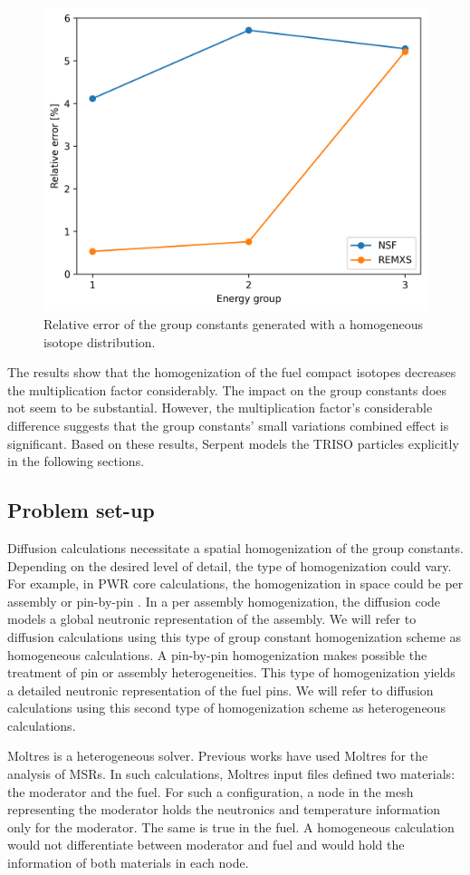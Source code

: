 \documentclass[11pt,letterpaper]{article}
\begin{document}
\begin{figure}[htbp!]
	\centering
	\includegraphics[width=0.43\linewidth]{figures/param-comparison}
	\hfill
	\caption{Relative error of the group constants generated with a homogeneous isotope distribution.}
	\label{fig:param-comparison}
\end{figure}

The results show that the homogenization of the fuel compact isotopes decreases the multiplication factor considerably.
The impact on the group constants does not seem to be substantial.
However, the multiplication factor's considerable difference suggests that the group constants’ small variations combined effect is significant.
Based on these results, Serpent models the TRISO particles explicitly in the following sections.


\subsection{Problem set-up}

Diffusion calculations necessitate a spatial homogenization of the group constants.
Depending on the desired level of detail, the type of homogenization could vary.
For example, in PWR core calculations, the homogenization in space could be per assembly or pin-by-pin \cite{krebs_calculational_1990}.
In a per assembly homogenization, the diffusion code models a global neutronic representation of the assembly.
We will refer to diffusion calculations using this type of group constant homogenization scheme as homogeneous calculations.
A pin-by-pin homogenization makes possible the treatment of pin or assembly heterogeneities.
This type of homogenization yields a detailed neutronic representation of the fuel pins.
We will refer to diffusion calculations using this second type of homogenization scheme as heterogeneous calculations.

Moltres is a heterogeneous solver.
Previous works \cite{lindsay_introduction_2018}\cite{pater_multiphysics_2019} have used Moltres for the analysis of \glspl{MSR}.
In such calculations, Moltres input files defined two materials: the moderator and the fuel.
For such a configuration, a node in the mesh representing the moderator holds the neutronics and temperature information only for the moderator.
The same is true in the fuel.
A homogeneous calculation would not differentiate between moderator and fuel and would hold the information of both materials in each node.
\end{document}
